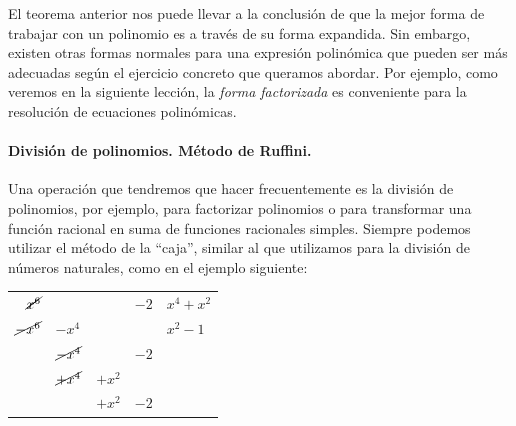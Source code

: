 El teorema anterior nos puede llevar a la conclusión de que la mejor forma de trabajar con un polinomio es a través de su forma expandida.
Sin embargo, existen otras formas normales para una expresión polinómica que pueden ser más adecuadas según el ejercicio concreto que queramos abordar.
Por ejemplo, como veremos en la siguiente lección, la \emph{forma factorizada} es conveniente para la resolución de ecuaciones polinómicas.



\paragraph{División de polinomios. Método de Ruffini.}
Una operación que tendremos que hacer frecuentemente es la división de polinomios, por ejemplo, para factorizar polinomios o para transformar una función racional en suma de funciones racionales simples.
Siempre podemos utilizar el método de la ``caja'', similar al que utilizamos para la división de números naturales, como en el ejemplo siguiente:

\begin{center}
\begin{tabular}{rllcl}
$\cancel{x^6}$ &  & & $-2$ & \multicolumn{1}{|l}{$x^4+x^2$} \\\cline{5-5}
$\cancel{-x^6}$ & $-x^4$ &&& $x^2-1$ \\\cline{1-4}
 & $\cancel{-x^4}$ & & $-2$ \\
 & $\cancel{+x^4}$ & $+x^2$ &\\\cline{2-4}
 &       &  $+x^2$ &$-2$
\end{tabular}
\end{center}

